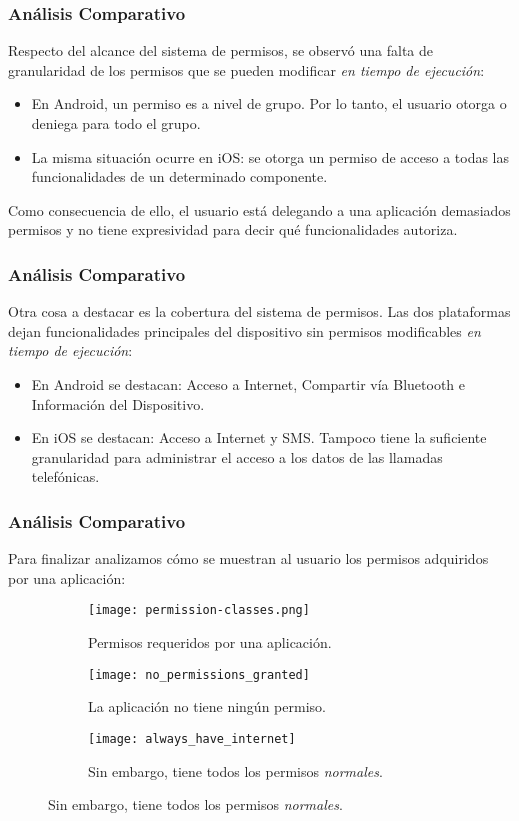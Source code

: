 \begin{frame}
 \frametitle{Análisis Comparativo}
Respecto del alcance del sistema de permisos, se observó una falta de granularidad de los permisos que se pueden modificar \emph{en tiempo de ejecución}:\pause
  \begin{itemize}[<+->]
   \item En Android, un permiso es a nivel de grupo. Por lo tanto, el usuario otorga o deniega para todo el grupo.
   \item La misma situación ocurre en iOS: se otorga un permiso de acceso a todas las funcionalidades de un determinado componente.
  \end{itemize}
\pause Como consecuencia de ello, el usuario está delegando a una aplicación demasiados permisos y no tiene expresividad para decir qué funcionalidades autoriza.
\end{frame}
\begin{frame}
 \frametitle{Análisis Comparativo}
Otra cosa a destacar es la cobertura del sistema de permisos. \pause Las dos plataformas dejan funcionalidades principales del dispositivo sin permisos modificables \emph{en tiempo de ejecución}:\pause
  \begin{itemize}[<+->]
   \item En Android se destacan: Acceso a Internet, Compartir vía Bluetooth e Información del Dispositivo.
   \item En iOS se destacan: Acceso a Internet y SMS. Tampoco tiene la suficiente granularidad para administrar el acceso a los datos de las llamadas telefónicas.
  \end{itemize}
\end{frame}
\begin{frame}
 \frametitle{Análisis Comparativo}
Para finalizar analizamos cómo se muestran al usuario los permisos adquiridos por una aplicación:\pause
\begin{figure}
	\centering
	\begin{subfigure}{.25\linewidth}
		\texttt{[image: permission-classes.png]}
		\caption{Permisos requeridos por una aplicación.}
		\label{fig:ch05:ios_all_permissions}
	\end{subfigure}\pause
	\begin{subfigure}{.25\linewidth}
		\texttt{[image: no\_permissions\_granted]}
		\caption{La aplicación no tiene ningún permiso.}
		\label{fig:ch05:without_permissions}
	\end{subfigure}\pause
	\begin{subfigure}{.25\linewidth}
		\texttt{[image: always\_have\_internet]}
		\caption{Sin embargo, tiene todos los permisos \emph{normales}.}
		\label{fig:ch05:always_have_internet}
	\end{subfigure}
\end{figure}
\end{frame}